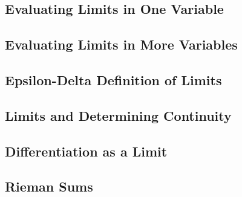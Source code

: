 \documentclass[../Math_Notes.tex]{subfiles}
\begin{document}
\subsection{Evaluating Limits in One Variable}
\subsection{Evaluating Limits in More Variables}
\subsection{Epsilon-Delta Definition of Limits}
\subsection{Limits and Determining Continuity}
\subsection{Differentiation as a Limit}
\subsection{Rieman Sums}
\end{document}
